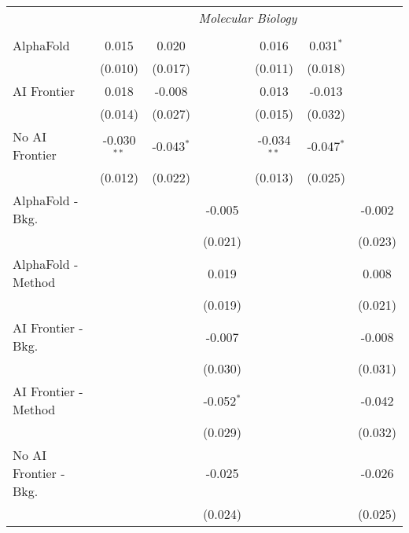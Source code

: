 \begin{tabular}{lcccccc}
 & \multicolumn{6}{c}{\textit{Molecular Biology}} \\ \\
   AlphaFold               & 0.015         & 0.020        &              & 0.016         & 0.031$^{*}$  &   \\   
                           & (0.010)       & (0.017)      &              & (0.011)       & (0.018)      &   \\   
   AI Frontier             & 0.018         & -0.008       &              & 0.013         & -0.013       &   \\   
                           & (0.014)       & (0.027)      &              & (0.015)       & (0.032)      &   \\   
   No AI Frontier          & -0.030$^{**}$ & -0.043$^{*}$ &              & -0.034$^{**}$ & -0.047$^{*}$ &   \\   
                           & (0.012)       & (0.022)      &              & (0.013)       & (0.025)      &   \\   
   AlphaFold - Bkg.        &               &              & -0.005       &               &              & -0.002\\   
                           &               &              & (0.021)      &               &              & (0.023)\\   
   AlphaFold - Method      &               &              & 0.019        &               &              & 0.008\\   
                           &               &              & (0.019)      &               &              & (0.021)\\   
   AI Frontier - Bkg.      &               &              & -0.007       &               &              & -0.008\\   
                           &               &              & (0.030)      &               &              & (0.031)\\   
   AI Frontier - Method    &               &              & -0.052$^{*}$ &               &              & -0.042\\   
                           &               &              & (0.029)      &               &              & (0.032)\\   
   No AI Frontier - Bkg.   &               &              & -0.025       &               &              & -0.026\\   
                           &               &              & (0.024)      &               &              & (0.025)\\   

\end{tabular}
